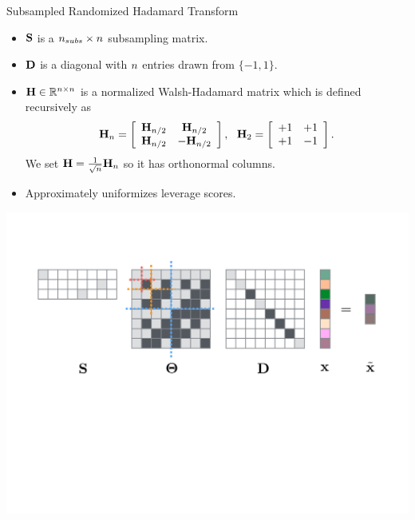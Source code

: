 \documentclass[final,t,english,professionalfonts, xcolor=dvipsnames]{beamer}
\begin{document}
\begin{frame}{}
{\begin{minipage}[c]{0.96\linewidth}
\begin{columns}[t]
\begin{column}{.33\linewidth}
\begin{block}{Subsampled Randomized Hadamard Transform}
\begin{itemize}
\item ${\mathbf{S}}$ is a $n_{subs}\times n$ subsampling matrix. %
\item ${\mathbf{D}}$ is a diagonal with $n$ entries drawn
  from $\{-1, 1\}$. %
\item ${\mathbf{H}} \in {\mathbb R}^{n \times n}$ is a normalized Walsh-Hadamard
  matrix %
    which is defined recursively as
$$
{\mathbf{H}}_n = \left[ {\begin{array}{cc} {\mathbf{H}}_{n/2} & {\mathbf{H}}_{n/2} \\ {\mathbf{H}}_{n/2} & -{\mathbf{H}}_{n/2} \end{array} } \right]
,~~
{\mathbf{H}}_2 = \left[ {\begin{array}{cc} +1 & +1 \\ +1 & -1 \end{array} } \right].
$$
We set ${\mathbf{H}} = \frac{1}{\sqrt{n}}{\mathbf{H}}_n$ so it has orthonormal
columns.

\item Approximately uniformizes leverage scores.
\end{itemize}
\vspace{0.5cm}
\begin{minipage}[b]{1\linewidth}
\begin{center}
  \includegraphics[width=0.9\linewidth]{figures/walsh_matrix}
  \end{center}
\end{minipage}
\end{block}









\end{column}
\end{columns}
\end{minipage}}
\end{frame}
\end{document}
